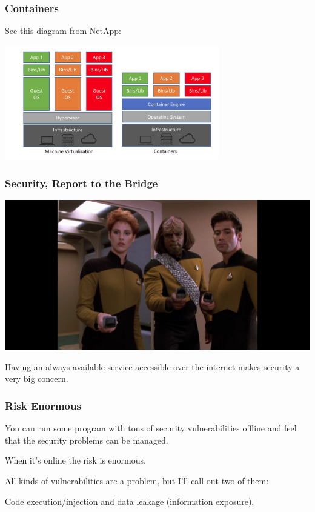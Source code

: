 \begin{frame}
\frametitle{Containers}

See this diagram from NetApp:

\begin{center}
	\includegraphics[width=0.7\textwidth]{images/cvm.png}
\end{center}


\end{frame}


\begin{frame}
\frametitle{Security, Report to the Bridge}

\begin{center}
	\includegraphics[width=\textwidth]{images/securityteam.jpg}
\end{center}

Having an always-available service accessible over the internet makes security a very big concern.

\end{frame}


\begin{frame}
\frametitle{Risk Enormous}

You can run some program with tons of security vulnerabilities offline and feel that the security problems can be managed. 

When it's online the risk is enormous. 

All kinds of vulnerabilities are a problem, but I'll call out two of them:

Code execution/injection and data leakage (information exposure). 


\end{frame}



